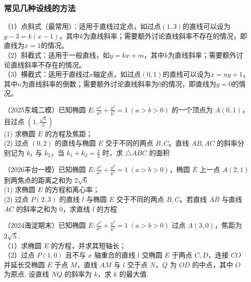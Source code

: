 \subsubsection*{常见几种设线的方法}
\noindent（1）点斜式（最常用）：适用于直线过定点，如过点$(1, 3)$的直线可以设为$y - 3 = k(x - 1)$，其中$k$为直线斜率；需要额外讨论直线斜率不存在的情况，即直线为$x = 1$的情况。\\
（2）斜截式：适用于一般直线，如$y = kx + m$，其中$k$为直线斜率；需要额外讨论直线斜率不存在的情况。\\
（3）横截式：适用于直线过$x$轴定点，如过点$(0,1)$的直线可以设为$x = ny + 1$，其中$n$为直线斜率的倒数；需要额外讨论直线斜率为0的情况，即直线为$y = 0$的情况。
\begin{example}
（2025东城二模）已知椭圆 $E:\frac{x^2}{a^2}+\frac{y^2}{b^2}=1\ (a>b>0)$ 的一个顶点为 $A(0,1)$，且过点 $\left(1,\frac{\sqrt{3}}{2}\right)$\\
(1) 求椭圆 $E$ 的方程及焦距；\\
(2) 过点 $\left(0,2\right)$ 的直线与椭圆 $E$ 交于不同的两点 $B,C$。直线 $AB,AC$ 的斜率分别记为 $k_1$ 与 $k_2$，当 $k_1+k_2=\frac{2}{3}$ 时，求 $\triangle ABC$ 的面积
\end{example}
\begin{property}
\vspace*{17\baselineskip}
\end{property}
\begin{example}
（2026丰台一模）已知椭圆 $E:\frac{x^2}{a^2}+\frac{y^2}{b^2}=1\ (a>b>0)$，椭圆 $E$ 上一点 $A(2,1)$ 到两焦点的距离之和为 $2\sqrt{6}$\\
(1) 求椭圆 $E$ 的方程和离心率；\\
(2) 过点 $P(2,3)$ 的直线 $l$ 与椭圆 $E$ 交于不同的两点 $B,C$。若直线 $AB$ 与直线 $AC$ 的斜率之和为 $0$，求直线 $l$ 的方程
\end{example}
\begin{property}
\end{property}
\newpage
\begin{example} %
（2024海淀期末）已知椭圆 $E:\frac{x^2}{a^2}+\frac{y^2}{b^2}=1\ (a>b>0)$ 过点 $A(3,0)$，焦距为 $2\sqrt{5}$.\\
（1）求椭圆 $E$ 的方程，并求其短轴长；\\
（2）过点 $P(1,0)$ 且不与 $x$ 轴重合的直线 $l$ 交椭圆 $E$ 于两点 $C,D$，连接 $CO$ 并延长交椭圆 $E$ 于点 $M$，直线 $AM$ 与 $l$ 交于点 $N$，$Q$ 为 $OD$ 的中点，其中 $O$ 为原点. 设直线 $NQ$ 的斜率为 $k$，求 $k$ 的最大值.
\end{example}
\begin{property}
\vspace*{15\baselineskip}
\end{property}

